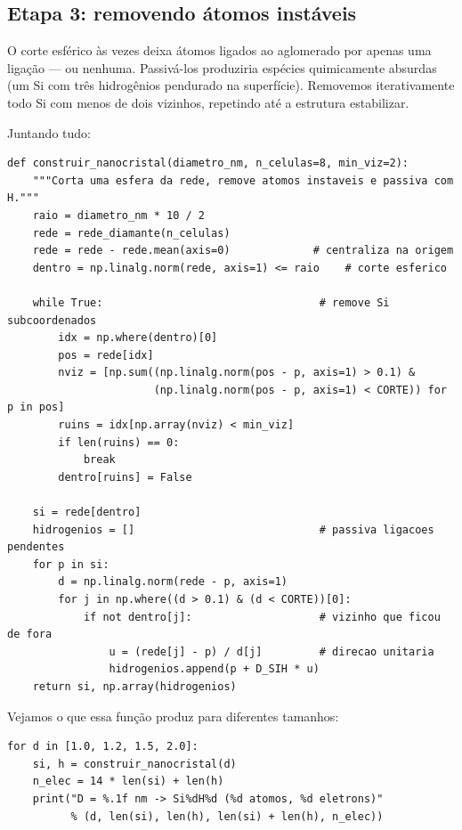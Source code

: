 \documentclass[11pt,a4paper,openany]{book}
\begin{document}
\subsection{Etapa 3: removendo átomos instáveis}

O corte esférico às vezes deixa átomos ligados ao aglomerado por apenas uma
ligação --- ou nenhuma. Passivá-los produziria espécies quimicamente absurdas
(um Si com três hidrogênios pendurado na superfície). Removemos iterativamente
todo Si com menos de dois vizinhos, repetindo até a estrutura estabilizar.

Juntando tudo:

\begin{lstlisting}[style=python,caption={Construindo o nanocristal passivado.},label={lst:construir}]
def construir_nanocristal(diametro_nm, n_celulas=8, min_viz=2):
    """Corta uma esfera da rede, remove atomos instaveis e passiva com H."""
    raio = diametro_nm * 10 / 2
    rede = rede_diamante(n_celulas)
    rede = rede - rede.mean(axis=0)             # centraliza na origem
    dentro = np.linalg.norm(rede, axis=1) <= raio    # corte esferico

    while True:                                  # remove Si subcoordenados
        idx = np.where(dentro)[0]
        pos = rede[idx]
        nviz = [np.sum((np.linalg.norm(pos - p, axis=1) > 0.1) &
                       (np.linalg.norm(pos - p, axis=1) < CORTE)) for p in pos]
        ruins = idx[np.array(nviz) < min_viz]
        if len(ruins) == 0:
            break
        dentro[ruins] = False

    si = rede[dentro]
    hidrogenios = []                             # passiva ligacoes pendentes
    for p in si:
        d = np.linalg.norm(rede - p, axis=1)
        for j in np.where((d > 0.1) & (d < CORTE))[0]:
            if not dentro[j]:                    # vizinho que ficou de fora
                u = (rede[j] - p) / d[j]         # direcao unitaria
                hidrogenios.append(p + D_SIH * u)
    return si, np.array(hidrogenios)
\end{lstlisting}

\noindent
Vejamos o que essa função produz para diferentes tamanhos:

\begin{lstlisting}[style=python]
for d in [1.0, 1.2, 1.5, 2.0]:
    si, h = construir_nanocristal(d)
    n_elec = 14 * len(si) + len(h)
    print("D = %.1f nm -> Si%dH%d (%d atomos, %d eletrons)"
          % (d, len(si), len(h), len(si) + len(h), n_elec))
\end{lstlisting}
\end{document}

